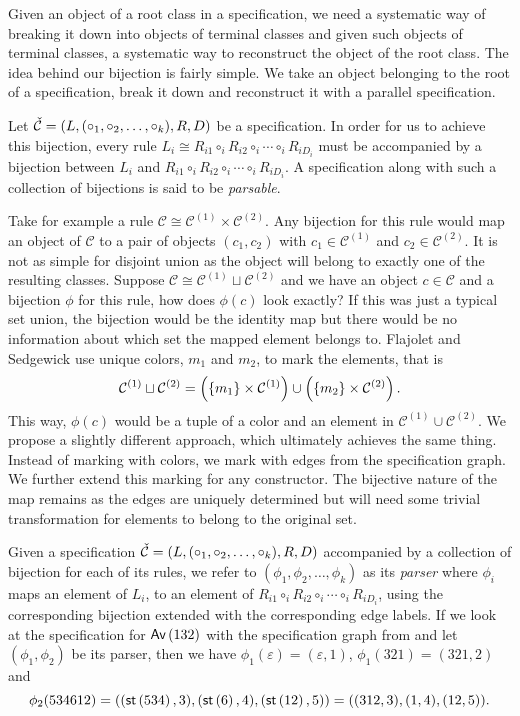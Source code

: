 \label{ch:pbijection}

Given an object of a root class in a specification, we need a systematic way of breaking it down into objects of terminal classes and given such objects of terminal classes, a systematic way to reconstruct the object of the root class. The idea behind our bijection is fairly simple. We take an object belonging to the root of a specification, break it down and reconstruct it with a parallel specification.

Let $\check{\mathcal{C}} = (L,(\circ_1,\circ_2,\dotsc,\circ_k),R,D)$ be a specification. In order for us to achieve this bijection, every rule $L_i \cong R_{i1} \circ_i R_{i2} \circ_i \dotsm \circ_i R_{iD_i}$ must be accompanied by a bijection between $L_i$ and $R_{i1} \circ_i R_{i2} \circ_i \dotsm \circ_i R_{iD_i}$. A specification along with such a collection of bijections is said to be \emph{parsable}.

Take for example a rule $\mathcal{C} \cong \mathcal{C}^{(1)} \times \mathcal{C}^{(2)}$. Any bijection for this rule would map an object of $\mathcal{C}$ to a pair of objects $(c_1,c_2)$ with $c_1 \in \mathcal{C}^{(1)}$ and $c_2 \in \mathcal{C}^{(2)}$. It is not as simple for disjoint union as the object will belong to exactly one of the resulting classes. Suppose $\mathcal{C} \cong \mathcal{C}^{(1)} \sqcup \mathcal{C}^{(2)}$ and we have an object $c\in\mathcal{C}$ and a bijection $\phi$ for this rule, how does $\phi(c)$ look exactly? If this was just a typical set union, the bijection would be the identity map but there would be no information about which set the mapped element belongs to. Flajolet and Sedgewick \cite{flajolet:ac} use unique colors, $m_1$ and $m_2$, to mark the elements, that is
\[
    \mathcal{C}^{(1)} \sqcup \mathcal{C}^{(2)} = \left(\left\{m_1\right\} \times \mathcal{C}^{(1)}\right) \cup \left(\left\{m_2\right\} \times \mathcal{C}^{(2)}\right).
\]
This way, $\phi(c)$ would be a tuple of a color and an element in $\mathcal{C}^{(1)} \cup \mathcal{C}^{(2)}$. We propose a slightly different approach, which ultimately achieves the same thing. Instead of marking with colors, we mark with edges from the specification graph. We further extend this marking for any constructor. The bijective nature of the map remains as the edges are uniquely determined but will need some trivial transformation for elements to belong to the original set.

Given a specification $\check{\mathcal{C}} = (L,(\circ_1,\circ_2,\dotsc,\circ_k),R,D)$ accompanied by a collection of bijection for each of its rules, we refer to $(\phi_1,\phi_2,\dotsc,\phi_k)$ as its \emph{parser} where $\phi_i$ maps an element of $L_i$, to an element of $R_{i1} \circ_i R_{i2} \circ_i \dotsm \circ_i R_{iD_i}$, using the corresponding bijection extended with the corresponding edge labels. If we look at the specification for $\textsf{Av}\left(132\right)$ with the specification graph from  and let $(\phi_1,\phi_2)$ be its parser, then we have $\phi_1(\varepsilon) = (\varepsilon, 1)$, $\phi_1(321) = (321, 2)$ and 
\[
    \phi_2(534612) = ((\textsf{st}\left(534\right),3), (\textsf{st}\left(6\right),4), (\textsf{st}\left(12\right),5)) = ((312,3), (1,4), (12,5)).
\]

